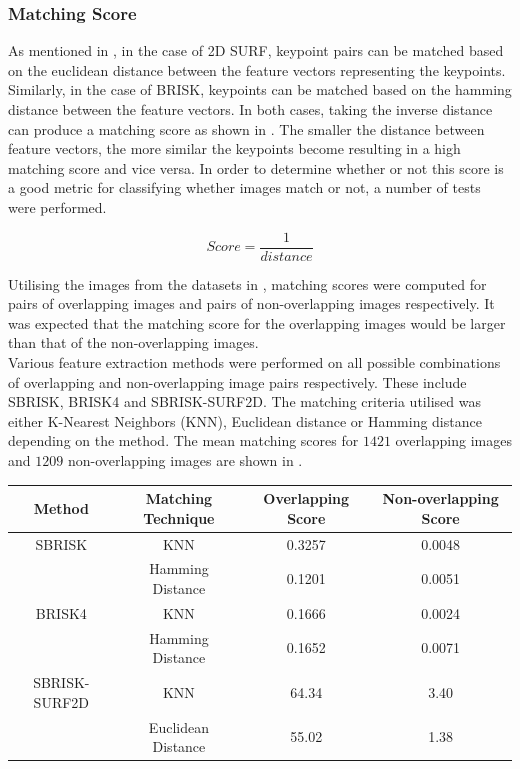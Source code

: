 \documentclass{article}
\begin{document}
\subsubsection{Matching Score}
\label{sec:matchingScore}
As mentioned in , in the case of 2D SURF, keypoint pairs can be matched based on the euclidean distance between the feature vectors representing the keypoints. Similarly, in the case of BRISK, keypoints can be matched based on the hamming distance between the feature vectors. In both cases, taking the inverse distance can produce a matching score as shown in . The smaller the distance between feature vectors, the more similar the keypoints become resulting in a high matching score and vice versa. In order to determine whether or not this score is a good metric for classifying whether images match or not, a number of tests were performed.

\begin{equation}
Score = \frac{1}{distance}
\label{eqn:inverseDistance}
\end{equation}

Utilising the images from the datasets in , matching scores were computed for pairs of overlapping images and pairs of non-overlapping images respectively. It was expected that the matching score for the overlapping images would be larger than that of the non-overlapping images. \\

Various feature extraction methods were performed on all possible combinations of overlapping and non-overlapping image pairs respectively. These include SBRISK, BRISK4 and SBRISK-SURF2D. The matching criteria utilised was either K-Nearest Neighbors (KNN), Euclidean distance or Hamming distance depending on the method. The mean matching scores for $1421$ overlapping images and $1209$ non-overlapping images are shown in .

\begin{table}
\begin{tabular}{|c|c|c|c|}
\hline 
Method & Matching Technique & Overlapping Score & Non-overlapping Score\tabularnewline
\hline 
\hline 
SBRISK & KNN & 0.3257 & 0.0048\tabularnewline
\hline 
 & Hamming Distance & 0.1201 & 0.0051\tabularnewline
\hline 
BRISK4 & KNN & 0.1666 & 0.0024\tabularnewline
\hline 
 & Hamming Distance & 0.1652 & 0.0071\tabularnewline
\hline 
SBRISK- SURF2D & KNN & 64.34 & 3.40\tabularnewline
\hline 
 & Euclidean Distance & 55.02 & 1.38\tabularnewline
\hline 
\end{tabular}
\label{tab:matchingScoreCompare}
\end{table}
\end{document}

